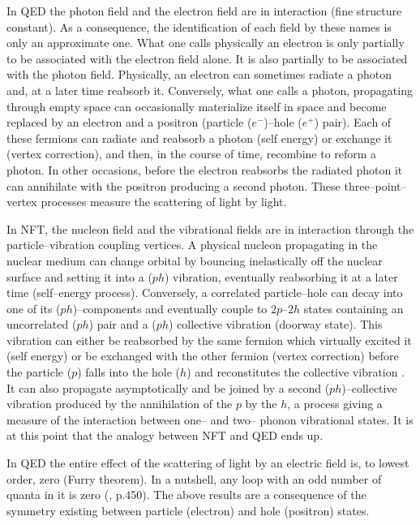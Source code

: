 \documentclass[a4paper,11pt]{article}
\numberwithin{equation}{section}
\numberwithin{figure}{section}
\numberwithin{table}{section}
\begin{document}
In QED the photon field and the electron field are in interaction (fine structure constant). As a consequence, the identification of each field by these names is only an approximate one. What one calls physically an electron is only partially to be associated with the electron field alone. It is also partially to be associated with the photon field. Physically, an electron can sometimes radiate a photon and, at a later time reabsorb it. Conversely, what one calls a photon, propagating through empty space can occasionally materialize itself in space and become replaced by an electron and a positron (particle ($e^-$)--hole ($e^+$) pair). Each of these fermions can radiate and reabsorb a photon (self energy) or exchange it (vertex correction), and then, in the course of time, recombine to reform a photon. In other occasions, before the electron reabsorbs the  radiated photon it can annihilate with the positron producing  a second photon. These three--point--vertex processes measure the scattering of light by light. 

In NFT, the nucleon field and the vibrational fields are in interaction through the particle--vibration coupling vertices. A physical nucleon propagating in the nuclear medium can change orbital by bouncing inelastically off the nuclear surface and setting it into a ($ph$) vibration, eventually reabsorbing it at a later time (self--energy process). Conversely, a correlated particle--hole can decay into one of its ($ph$)--components and eventually couple to $2p$--$2h$ states containing an uncorrelated ($ph$) pair and a  ($ph$) collective vibration (doorway state). This vibration can either be reabsorbed by the same fermion which virtually excited it (self energy) or be exchanged with the other fermion (vertex correction) before the particle ($p$) falls into the hole ($h$) and reconstitutes the collective vibration \cite{Bertsch:83}. It can also propagate asymptotically and be joined by a second ($ph$)--collective vibration produced by the annihilation of the $p$ by the $h$, a process giving a measure of the interaction between one-- and two-- phonon vibrational states. It is at this point that the analogy between NFT and QED ends up.

In QED the entire effect of the scattering of light by an electric field is, to lowest order, zero (Furry theorem). In a nutshell, any loop with an odd number of quanta in it is zero (\cite{Schweber:94}, p.450). The above results are a consequence of the symmetry existing between particle (electron) and hole (positron) states.
\end{document}
